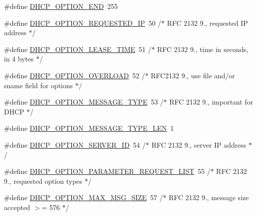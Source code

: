 \begin{DoxyCompactItemize}
\item 
\#define \hyperlink{openmote-cc2538_2lwip_2src_2include_2lwip_2prot_2dhcp_8h_aea2eb67064efec2c65fff4497f659e7d}{D\+H\+C\+P\+\_\+\+O\+P\+T\+I\+O\+N\+\_\+\+E\+ND}~255
\item 
\#define \hyperlink{openmote-cc2538_2lwip_2src_2include_2lwip_2prot_2dhcp_8h_a1cbad840414a6617ebdb17b1b9073597}{D\+H\+C\+P\+\_\+\+O\+P\+T\+I\+O\+N\+\_\+\+R\+E\+Q\+U\+E\+S\+T\+E\+D\+\_\+\+IP}~50 /$\ast$ R\+FC 2132 9., requested IP address $\ast$/
\item 
\#define \hyperlink{openmote-cc2538_2lwip_2src_2include_2lwip_2prot_2dhcp_8h_a458994de9415a8a622d1a560bfd9ace4}{D\+H\+C\+P\+\_\+\+O\+P\+T\+I\+O\+N\+\_\+\+L\+E\+A\+S\+E\+\_\+\+T\+I\+ME}~51 /$\ast$ R\+FC 2132 9., time in seconds, in 4 bytes $\ast$/
\item 
\#define \hyperlink{openmote-cc2538_2lwip_2src_2include_2lwip_2prot_2dhcp_8h_afa25c2c462288d2ab8cec19d22af661f}{D\+H\+C\+P\+\_\+\+O\+P\+T\+I\+O\+N\+\_\+\+O\+V\+E\+R\+L\+O\+AD}~52 /$\ast$ R\+F\+C2132 9., use file and/or sname field for options $\ast$/
\item 
\#define \hyperlink{openmote-cc2538_2lwip_2src_2include_2lwip_2prot_2dhcp_8h_ab023a7a8b3307a68a2eff10a217e48a8}{D\+H\+C\+P\+\_\+\+O\+P\+T\+I\+O\+N\+\_\+\+M\+E\+S\+S\+A\+G\+E\+\_\+\+T\+Y\+PE}~53 /$\ast$ R\+FC 2132 9., important for D\+H\+CP $\ast$/
\item 
\#define \hyperlink{openmote-cc2538_2lwip_2src_2include_2lwip_2prot_2dhcp_8h_a9cf37917cca6ff44e6e409e1fc30ce6b}{D\+H\+C\+P\+\_\+\+O\+P\+T\+I\+O\+N\+\_\+\+M\+E\+S\+S\+A\+G\+E\+\_\+\+T\+Y\+P\+E\+\_\+\+L\+EN}~1
\item 
\#define \hyperlink{openmote-cc2538_2lwip_2src_2include_2lwip_2prot_2dhcp_8h_a3bdf84c273501fb73ad217dcab87bb4a}{D\+H\+C\+P\+\_\+\+O\+P\+T\+I\+O\+N\+\_\+\+S\+E\+R\+V\+E\+R\+\_\+\+ID}~54 /$\ast$ R\+FC 2132 9., server IP address $\ast$/
\item 
\#define \hyperlink{openmote-cc2538_2lwip_2src_2include_2lwip_2prot_2dhcp_8h_a8b484e555c18f2d20df9a2267f35bced}{D\+H\+C\+P\+\_\+\+O\+P\+T\+I\+O\+N\+\_\+\+P\+A\+R\+A\+M\+E\+T\+E\+R\+\_\+\+R\+E\+Q\+U\+E\+S\+T\+\_\+\+L\+I\+ST}~55 /$\ast$ R\+FC 2132 9., requested option types $\ast$/
\item 
\#define \hyperlink{openmote-cc2538_2lwip_2src_2include_2lwip_2prot_2dhcp_8h_aabc084bbce4768f1a2ec17caa0aac858}{D\+H\+C\+P\+\_\+\+O\+P\+T\+I\+O\+N\+\_\+\+M\+A\+X\+\_\+\+M\+S\+G\+\_\+\+S\+I\+ZE}~57 /$\ast$ R\+FC 2132 9., message size accepted $>$= 576 $\ast$/
\item 

\end{DoxyCompactItemize}
